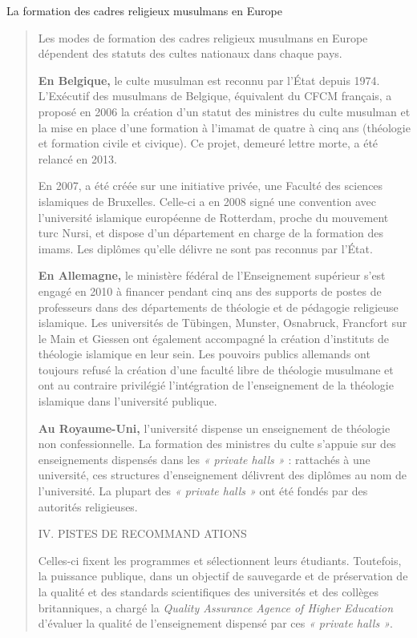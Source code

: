 La formation des cadres religieux musulmans en Europe

\begin{quote}
Les modes de formation des cadres religieux musulmans en Europe
dépendent des statuts des cultes nationaux dans chaque pays.

\textbf{En Belgique,} le culte musulman est reconnu par l'État depuis
1974. L'Exécutif des musulmans de Belgique, équivalent du CFCM français,
a proposé en 2006 la création d'un statut des ministres du culte
musulman et la mise en place d'une formation à l'imamat de quatre à cinq
ans (théologie et formation civile et civique). Ce projet, demeuré
lettre morte, a été relancé en 2013.

En 2007, a été créée sur une initiative privée, une Faculté des sciences
islamiques de Bruxelles. Celle-ci a en 2008 signé une convention avec
l'université islamique européenne de Rotterdam, proche du mouvement turc
Nursi, et dispose d'un département en charge de la formation des imams.
Les diplômes qu'elle délivre ne sont pas reconnus par l'État.

\textbf{En Allemagne,} le ministère fédéral de l'Enseignement supérieur
s'est engagé en 2010 à financer pendant cinq ans des supports de postes
de professeurs dans des départements de théologie et de pédagogie
religieuse islamique. Les universités de Tübingen, Munster, Osnabruck,
Francfort sur le Main et Giessen ont également accompagné la création
d'instituts de théologie islamique en leur sein. Les pouvoirs publics
allemands ont toujours refusé la création d'une faculté libre de
théologie musulmane et ont au contraire privilégié l'intégration de
l'enseignement de la théologie islamique dans l'université publique.

\textbf{Au Royaume-Uni,} l'université dispense un enseignement de
théologie non confessionnelle. La formation des ministres du culte
s'appuie sur des enseignements dispensés dans les \emph{« private halls
»} : rattachés à une université, ces structures d'enseignement délivrent
des diplômes au nom de l'université. La plupart des \emph{« private
halls »} ont été fondés par des autorités religieuses.

IV. PISTES DE RECOMMAND ATIONS

Celles-ci fixent les programmes et sélectionnent leurs étudiants.
Toutefois, la puissance publique, dans un objectif de sauvegarde et de
préservation de la qualité et des standards scientifiques des
universités et des collèges britanniques, a chargé la \emph{Quality
Assurance Agence of Higher Education} d'évaluer la qualité de
l'enseignement dispensé par ces \emph{« private halls »}.


\end{quote}
